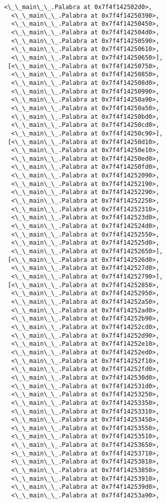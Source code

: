 \documentclass[12pt,a4paper,table]{article}
\begin{document}
\begin{tcolorbox}[breakable, size=fbox, boxrule=.5pt, pad at break*=1mm, opacityfill=0]
\begin{Verbatim}[commandchars=\\\{\}]
  <\_\_main\_\_.Palabra at 0x7f4f142502d0>,
  <\_\_main\_\_.Palabra at 0x7f4f14250390>,
  <\_\_main\_\_.Palabra at 0x7f4f14250450>,
  <\_\_main\_\_.Palabra at 0x7f4f142504d0>,
  <\_\_main\_\_.Palabra at 0x7f4f14250590>,
  <\_\_main\_\_.Palabra at 0x7f4f14250610>,
  <\_\_main\_\_.Palabra at 0x7f4f14250650>],
 [<\_\_main\_\_.Palabra at 0x7f4f14250750>,
  <\_\_main\_\_.Palabra at 0x7f4f14250850>,
  <\_\_main\_\_.Palabra at 0x7f4f142508d0>,
  <\_\_main\_\_.Palabra at 0x7f4f14250990>,
  <\_\_main\_\_.Palabra at 0x7f4f14250a90>,
  <\_\_main\_\_.Palabra at 0x7f4f14250a50>,
  <\_\_main\_\_.Palabra at 0x7f4f14250bd0>,
  <\_\_main\_\_.Palabra at 0x7f4f14250cd0>,
  <\_\_main\_\_.Palabra at 0x7f4f14250c90>],
 [<\_\_main\_\_.Palabra at 0x7f4f14250d10>,
  <\_\_main\_\_.Palabra at 0x7f4f14250e10>,
  <\_\_main\_\_.Palabra at 0x7f4f14250ed0>,
  <\_\_main\_\_.Palabra at 0x7f4f14250fd0>,
  <\_\_main\_\_.Palabra at 0x7f4f14252090>,
  <\_\_main\_\_.Palabra at 0x7f4f14252190>,
  <\_\_main\_\_.Palabra at 0x7f4f14252290>,
  <\_\_main\_\_.Palabra at 0x7f4f14252250>,
  <\_\_main\_\_.Palabra at 0x7f4f14252310>,
  <\_\_main\_\_.Palabra at 0x7f4f142523d0>,
  <\_\_main\_\_.Palabra at 0x7f4f142524d0>,
  <\_\_main\_\_.Palabra at 0x7f4f14252550>,
  <\_\_main\_\_.Palabra at 0x7f4f142525d0>,
  <\_\_main\_\_.Palabra at 0x7f4f14252650>],
 [<\_\_main\_\_.Palabra at 0x7f4f142526d0>,
  <\_\_main\_\_.Palabra at 0x7f4f142527d0>,
  <\_\_main\_\_.Palabra at 0x7f4f14252790>],
 [<\_\_main\_\_.Palabra at 0x7f4f14252850>,
  <\_\_main\_\_.Palabra at 0x7f4f14252950>,
  <\_\_main\_\_.Palabra at 0x7f4f14252a50>,
  <\_\_main\_\_.Palabra at 0x7f4f14252ad0>,
  <\_\_main\_\_.Palabra at 0x7f4f14252b90>,
  <\_\_main\_\_.Palabra at 0x7f4f14252cd0>,
  <\_\_main\_\_.Palabra at 0x7f4f14252d90>,
  <\_\_main\_\_.Palabra at 0x7f4f14252e10>,
  <\_\_main\_\_.Palabra at 0x7f4f14252ed0>,
  <\_\_main\_\_.Palabra at 0x7f4f14252f10>,
  <\_\_main\_\_.Palabra at 0x7f4f14252fd0>,
  <\_\_main\_\_.Palabra at 0x7f4f142530d0>,
  <\_\_main\_\_.Palabra at 0x7f4f142531d0>,
  <\_\_main\_\_.Palabra at 0x7f4f14253250>,
  <\_\_main\_\_.Palabra at 0x7f4f14253350>,
  <\_\_main\_\_.Palabra at 0x7f4f14253310>,
  <\_\_main\_\_.Palabra at 0x7f4f14253450>,
  <\_\_main\_\_.Palabra at 0x7f4f14253550>,
  <\_\_main\_\_.Palabra at 0x7f4f14253510>,
  <\_\_main\_\_.Palabra at 0x7f4f14253650>,
  <\_\_main\_\_.Palabra at 0x7f4f14253710>,
  <\_\_main\_\_.Palabra at 0x7f4f14253810>,
  <\_\_main\_\_.Palabra at 0x7f4f14253850>,
  <\_\_main\_\_.Palabra at 0x7f4f14253910>,
  <\_\_main\_\_.Palabra at 0x7f4f142539d0>,
  <\_\_main\_\_.Palabra at 0x7f4f14253a90>,

\end{Verbatim}
\end{tcolorbox}
\end{document}
